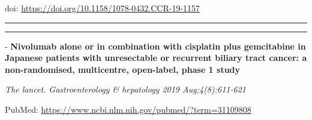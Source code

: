 \documentclass[]{article}
\begin{document}
doi: \url{https://doi.org/10.1158/1078-0432.CCR-19-1157}

{}

{}

\begin{center}\rule{0.5\linewidth}{\linethickness}\end{center}

\begin{center}\rule{0.5\linewidth}{\linethickness}\end{center}

 - \textbf{Nivolumab alone or in combination with cisplatin plus
gemcitabine in Japanese patients with unresectable or recurrent biliary
tract cancer: a non-randomised, multicentre, open-label, phase 1 study}

\emph{The lancet. Gastroenterology \& hepatology 2019 Aug;4(8):611-621}

PubMed: \url{https://www.ncbi.nlm.nih.gov/pubmed/?term=31109808}
\end{document}

